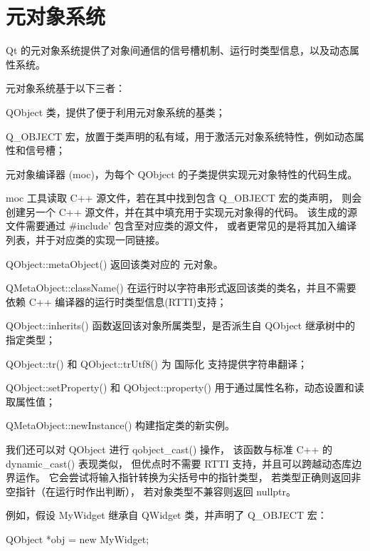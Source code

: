 \chapter{元对象系统}

Qt 的元对象系统提供了对象间通信的信号槽机制、运行时类型信息，以及动态属性系统。

元对象系统基于以下三者：

\begin{compactenum}
\item QObject 类，提供了便于利用元对象系统的基类；
\item Q\_OBJECT 宏，放置于类声明的私有域，用于激活元对象系统特性，例如动态属性和信号槽；
\item 元对象编译器 (moc)，为每个 QObject 的子类提供实现元对象特性的代码生成。
\end{compactenum}

moc 工具读取 C++ 源文件，若在其中找到包含 Q\_OBJECT 宏的类声明，
则会创建另一个 C++ 源文件，并在其中填充用于实现元对象得的代码。
该生成的源文件需要通过 \#include' 包含至对应类的源文件，
或者更常见的是将其加入编译列表，并于对应类的实现一同链接。

\begin{compactitem}
\item QObject::metaObject() 返回该类对应的 元对象。
\item QMetaObject::className() 在运行时以字符串形式返回该类的类名，并且不需要依赖 C++ 编译器的运行时类型信息(RTTI)支持；
\item QObject::inherits() 函数返回该对象所属类型，是否派生自 QObject 继承树中的指定类型；
\item QObject::tr() 和 QObject::trUtf8() 为 国际化 支持提供字符串翻译；
\item QObject::setProperty() 和 QObject::property() 用于通过属性名称，动态设置和读取属性值；
\item QMetaObject::newInstance() 构建指定类的新实例。
\end{compactitem}

我们还可以对 QObject 进行 qobject\_cast() 操作，
该函数与标准 C++ 的 dynamic\_cast() 表现类似，
但优点时不需要 RTTI 支持，并且可以跨越动态库边界运作。
它会尝试将输入指针转换为尖括号中的指针类型，
若类型正确则返回非空指针（在运行时作出判断），
若对象类型不兼容则返回 nullptr。

例如，假设 MyWidget 继承自 QWidget 类，并声明了 Q\_OBJECT 宏：

\begin{cppcode}
QObject *obj = new MyWidget;
\end{cppcode}

